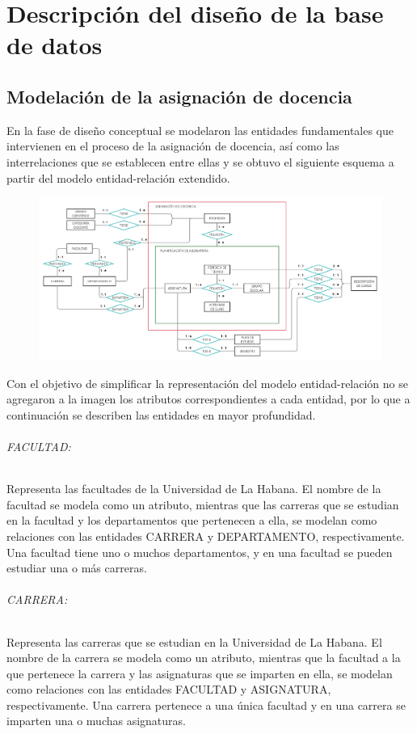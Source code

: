 \chapter{Descripción del diseño de la base de datos}\label{chapter:database}

\section{Modelación de la asignación de docencia}\label{database:asignación-docencia}
En la fase de diseño conceptual se modelaron las entidades fundamentales
que intervienen en el proceso de la asignación de docencia, 
así como las interrelaciones que se establecen entre ellas
y se obtuvo el siguiente
esquema a partir del modelo entidad-relación extendido.

\begin{figure}[H]
    \includegraphics[scale=0.2]{Graphics/Database/MERXX-TA-FINAL.png}
\end{figure}


Con el objetivo de simplificar la representación del modelo entidad-relación
no se agregaron a la imagen los atributos correspondientes a cada entidad, por lo 
que a continuación se describen las entidades en mayor profundidad.


\subparagraph{FACULTAD:}
Representa las facultades de la Universidad de La Habana.
El nombre de la facultad se modela como un atributo, mientras que 
las carreras que se estudian en la facultad y los departamentos que pertenecen 
a ella, se modelan como relaciones con las entidades CARRERA y DEPARTAMENTO, respectivamente.
Una facultad tiene uno o muchos departamentos, y en 
una facultad se pueden estudiar una o más carreras.

\subparagraph{CARRERA:}
Representa las carreras que se estudian en la Universidad de La Habana.
El nombre de la carrera se modela como un atributo, mientras que la facultad a la que pertenece la carrera y
las asignaturas que se imparten en ella, se modelan como relaciones con las entidades FACULTAD y
ASIGNATURA, respectivamente. 
Una carrera pertenece a una única facultad y en una carrera se imparten una o muchas asignaturas.

